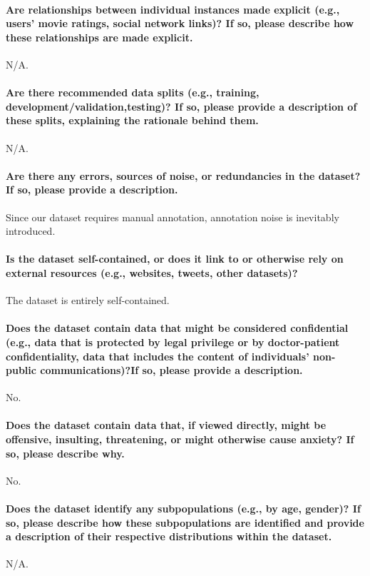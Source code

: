\documentclass{article}
\begin{document}
\paragraph{Are relationships between individual instances made explicit (e.g., users’ movie ratings, social network links)? If so, please describe how these relationships are made explicit. }
N/A.

\paragraph{Are there recommended data splits (e.g., training, development/validation,testing)? If so, please provide a description of these splits, explaining the rationale behind them.}
N/A.

\paragraph{Are there any errors, sources of noise, or redundancies in the dataset? If so, please provide a description.}
Since our dataset requires manual annotation, annotation noise is inevitably introduced.


\paragraph{Is the dataset self-contained, or does it link to or otherwise rely on external resources (e.g.,
websites, tweets, other datasets)?}
The dataset is entirely self-contained.

\paragraph{Does the dataset contain data that might be considered confidential (e.g., data that is protected by legal privilege or by doctor-patient confidentiality, data that includes the content of individuals’ non-public communications)?If so, please provide a description.}
No.


\paragraph{Does the dataset contain data that, if viewed directly, might be offensive, insulting, threatening, or might otherwise cause anxiety? If so, please describe why.}
No.

\paragraph{Does the dataset identify any subpopulations (e.g., by age, gender)? If so, please describe how these subpopulations are identified and provide a description of their respective distributions within the dataset.}
N/A.
\end{document}
